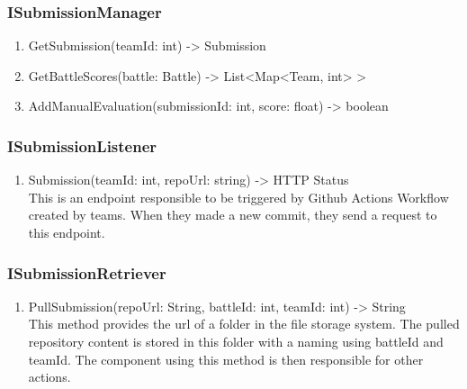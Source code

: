 \subsubsection{ISubmissionManager}
\begin{enumerate}
    \item GetSubmission(teamId: int) -> Submission
    \item GetBattleScores(battle: Battle) -> List<Map<Team, int> >
   \item AddManualEvaluation(submissionId: int, score: float) -> boolean
\end{enumerate}
\subsubsection{ISubmissionListener}
\begin{enumerate}
    \item Submission(teamId: int, repoUrl: string) -> HTTP Status \\
    This is an endpoint responsible to be triggered by Github Actions Workflow created by teams. When they made a new commit, they  send a request to this endpoint.
\end{enumerate}
\subsubsection{ISubmissionRetriever}
\begin{enumerate}
    \item PullSubmission(repoUrl: String, battleId: int, teamId: int) -> String \\
    This method provides the url of a folder in the file storage system. The pulled repository content is stored in this folder with a naming using battleId and teamId. The component using this method is then responsible for other actions.
    \end{enumerate}
